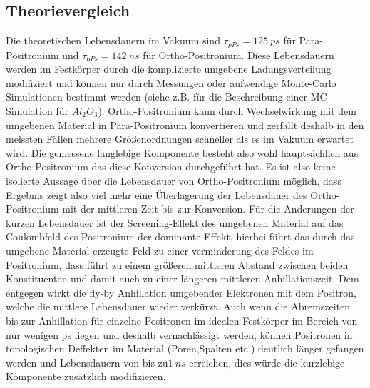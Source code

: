 \documentclass[a4paper,12pt]{article}
\begin{document}
\subsection{Theorievergleich}
Die theoretischen Lebensdauern im Vakuum sind $\tau_{pPs} = \SI{125}{ps}$ für Para-Positronium und $\tau_{oPs} = \SI{142}{ns}$ für Ortho-Positronium. Diese Lebensdauern werden
im Festkörper durch die komplizierte umgebene Ladungsverteilung modifiziert und können nur durch Messungen oder aufwendige Monte-Carlo Simulationen bestimmt werden 
(siehe z.B. \cite{phd_trezzi} für die Beschreibung einer MC Simulation für $Al_{2}O_{3}$). Ortho-Positronium kann durch Wechselwirkung mit dem umgebenen Material in Para-Positronium konvertieren
und zerfällt deshalb in den meissten Fällen mehrere Größenordnungen schneller als es im Vakuum erwartet wird. Die gemessene langlebige Komponente besteht also wohl hauptsächlich aus
Ortho-Positronium das diese Konversion durchgeführt hat. Es ist also keine isolierte Aussage über die Lebensdauer von Ortho-Positronium möglich, dass Ergebnis zeigt also viel mehr eine 
Überlagerung der Lebensdauer des Ortho-Positronium mit der mittleren Zeit bis zur Konversion. Für die Änderungen der kurzen Lebensdauer ist der Screening-Effekt des umgebenen Material auf 
das Coulombfeld des Positronium der dominante Effekt, hierbei führt das durch das umgebene Material erzeugte Feld zu einer verminderung des Feldes im Positronium, dass führt zu einem 
größeren mittleren Abstand zwischen beiden Konstituenten und damit auch zu einer längeren mittleren Anhillationszeit. Dem entgegen wirkt die fly-by Anhillation umgebender Elektronen mit
dem Positron, welche die mittlere Lebensdauer wieder verkürzt. Auch wenn die Abremszeiten bis zur Anhillation für einzelne Positronen im idealen Festkörper im Bereich von nur wenigen 
ps liegen und deshalb vernachlässigt werden, können Positronen in topologischen Deffekten im Material (Poren,Spalten etc.) deutlich länger gefangen werden und Lebensdauern von bis zu$ \SI{1}{ns}$
erreichen, dies würde die kurzlebige Komponente zusätzlich modifizieren.



{}
\end{document}
